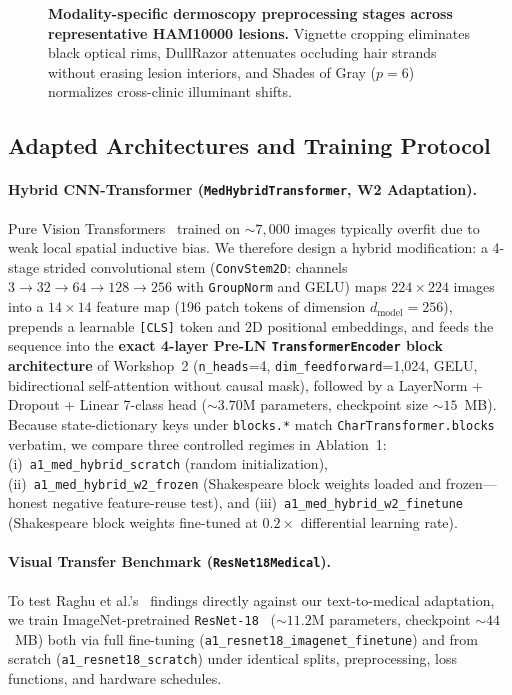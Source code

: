 \begin{figure}[htbp]
\centering
{}
\caption{\textbf{Modality-specific dermoscopy preprocessing stages across representative HAM10000 lesions.} Vignette cropping eliminates black optical rims, DullRazor attenuates occluding hair strands without erasing lesion interiors, and Shades of Gray ($p=6$) normalizes cross-clinic illuminant shifts.}
\label{fig:preprocessing_examples}
\end{figure}

\subsection{Adapted Architectures and Training Protocol}
\paragraph{Hybrid CNN-Transformer (\texttt{MedHybridTransformer}, W2 Adaptation).}
Pure Vision Transformers~\cite{Dosovitskiy2020image} trained on $\sim 7,000$ images typically overfit due to weak local spatial inductive bias. We therefore design a hybrid modification: a 4-stage strided convolutional stem (\texttt{ConvStem2D}: channels $3 \to 32 \to 64 \to 128 \to 256$ with \texttt{GroupNorm} and GELU) maps $224\times 224$ images into a $14\times 14$ feature map (196 patch tokens of dimension $d_{\text{model}}=256$), prepends a learnable \texttt{[CLS]} token and 2D positional embeddings, and feeds the sequence into the \textbf{exact 4-layer Pre-LN \texttt{TransformerEncoder} block architecture} of Workshop~2 (\texttt{n\_heads}=4, \texttt{dim\_feedforward}=1,024, GELU, bidirectional self-attention without causal mask), followed by a LayerNorm + Dropout + Linear 7-class head ($\sim 3.70$M parameters, checkpoint size $\sim 15$~MB). Because state-dictionary keys under \texttt{blocks.*} match \texttt{CharTransformer.blocks} verbatim, we compare three controlled regimes in Ablation~1: (i)~\texttt{a1\_med\_hybrid\_scratch} (random initialization), (ii)~\texttt{a1\_med\_hybrid\_w2\_frozen} (Shakespeare block weights loaded and frozen—honest negative feature-reuse test), and (iii)~\texttt{a1\_med\_hybrid\_w2\_finetune} (Shakespeare block weights fine-tuned at $0.2\times$ differential learning rate).

\paragraph{Visual Transfer Benchmark (\texttt{ResNet18Medical}).}
To test Raghu et al.'s~\cite{Raghu2019transfusion} findings directly against our text-to-medical adaptation, we train ImageNet-pretrained \texttt{ResNet-18}~\cite{He2016deep} ($\sim 11.2$M parameters, checkpoint $\sim 44$~MB) both via full fine-tuning (\texttt{a1\_resnet18\_imagenet\_finetune}) and from scratch (\texttt{a1\_resnet18\_scratch}) under identical splits, preprocessing, loss functions, and hardware schedules.


